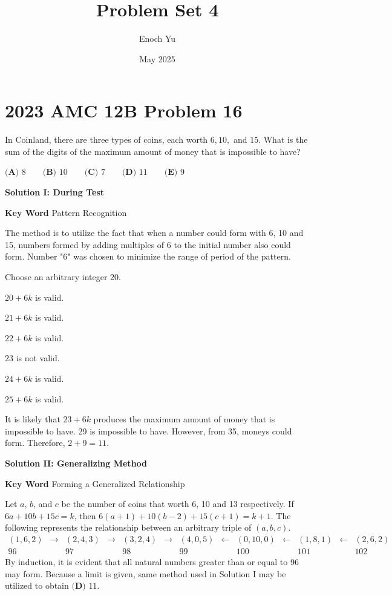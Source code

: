 \documentclass{article}
\title{Problem Set 4}
\author{Enoch Yu}
\date{May 2025}
\begin{document}
\section*{2023 AMC 12B Problem 16}
In Coinland, there are three types of coins, each
worth $6, 10,$ and $15$. What is the sum of the digits
of the maximum amount of money that is impossible to have?

$\textbf{(A) } 8 \qquad \textbf{(B) } 10 \qquad
\textbf{(C) } 7 \qquad \textbf{(D) } 11
\qquad \textbf{(E) } 9$

\textbf{Solution I: During Test}

\textbf{Key Word} Pattern Recognition

The method is to utilize the fact that when a number
could form with 6, 10 and 15, numbers formed by adding
multiples of 6 to the initial number also could form.
Number "6" was chosen to minimize the range of period
of the pattern.

Choose an arbitrary integer 20.

$20+6k$ is valid.

$21+6k$ is valid.

$22+6k$ is valid.

$23$ is not valid.

$24+6k$ is valid.

$25+6k$ is valid.

It is likely that $23 + 6k$ produces the maximum
amount of money that is impossible to have. 29 is
impossible to have. However, from 35, moneys could form.
Therefore, $2 + 9 = \boxed{11}$.


\textbf{Solution II: Generalizing Method}

\textbf{Key Word} Forming a Generalized Relationship

Let $a$, $b$, and $c$ be the number of coins that worth
6, 10 and 13 respectively. If $6a + 10b + 15c = k$, then
$6 (a + 1) + 10 (b - 2) + 15 (c + 1) = k + 1$. The
following represents the relationship between an arbitrary
triple of $(a, b, c)$.
\[
\begin{array}{ccccccccccccc}
    (1, 6, 2) & \rightarrow & (2, 4, 3) & \rightarrow
    & (3, 2, 4) & \rightarrow & (4, 0, 5) & \leftarrow
    & (0, 10, 0) & \leftarrow & (1, 8, 1) & \leftarrow
    & (2,6,2) \\
    96 & & 97 & & 98 & & 99 & & 100 & & 101 & & 102
\end{array}
\]
By induction, it is evident that all natural numbers
greater than or equal to 96 may form. Because a limit
is given, same method used in Solution I may be utilized
to obtain $\boxed{\textbf{(D) } 11}$.
\end{document}

